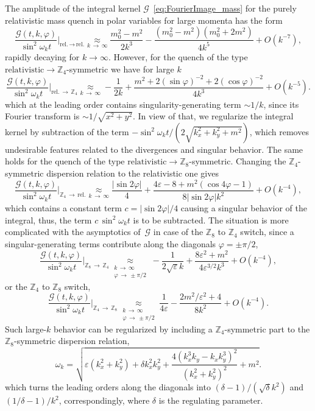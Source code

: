 \documentclass[a4paper,12pt]{article}
\newcommand{\be}{\begin{equation}}
\newcommand{\ee}{\end{equation}}
\newcommand{\eps}{\varepsilon}
\newcommand{\om}{\omega}
\newcommand{\largemom}{\underset{k\,\to\,\infty}{\approx}}
\newcommand{\Z}[1]{\mathbb{Z}_{#1}}
\begin{document}
The amplitude of the integral kernel $\mathcal{G}$~\eqref{eq:FourierImage_mass} for the purely relativistic mass quench in polar variables for large momenta has the form
\be
    \frac{\mathcal{G}(t, k, \varphi)}{\sin^2\om_k t}\Big|_{\text{rel.}\,\to\,\text{rel.}} \largemom \frac{m_0^2 - m^2}{2k^3} - \frac{(m_0^2 - m^2)(m_0^2 + 2m^2)}{4 k^5} + O\left(k^{-7}\right),
\ee
rapidly decaying for $k \to \infty$. However, for the quench of the type $\text{relativistic} \to \Z4$-symmetric we have for large $k$
\be
    \frac{\mathcal{G}(t, k, \varphi)}{\sin^2\om_k t}\Big|_{\text{rel.}\,\to\,\Z4} \largemom -\frac{1}{2k} + \frac{m^2 + 2(\sin\varphi)^{-2} + 2(\cos\varphi)^{-2}}{4 k^3} + O\left(k^{-5}\right).
\ee
which at the leading order contains singularity-generating term $\sim 1/k$, since its Fourier transform is $\sim 1/\sqrt{x^2 + y^2}$. In view of that, we regularize the integral kernel by subtraction of the term $-\sin^2\omega_k t/(2\sqrt{k_x^2 + k_y^2 + m^2})$, which removes undesirable features related to the divergences and singular behavior. The same holds for the quench of the type $\text{relativistic} \to \Z8$-symmetric. Changing the $\Z4$-symmetric dispersion relation to the relativistic one gives
\be
    \frac{\mathcal{G}(t, k, \varphi)}{\sin^2\om_k t}\Big|_{\Z4\,\to\,\text{rel.}} \largemom \frac{|\sin 2\varphi|}{4} + \frac{4\eps - 8 + m^2(\cos 4\varphi - 1)}{8|\sin 2\varphi|k^2} + O\left(k^{-4}\right),
\ee
which contains a constant term $c = |\sin 2\varphi|/4$ causing a singular behavior of the integral, thus, the term $c\,\sin^2\omega_k t$ is to be subtracted. The situation is more complicated with the asymptotics of~$\mathcal{G}$ in case of the $\Z8$ to $\Z4$ switch, since a singular-generating terms contribute along the diagonals $\varphi = \pm\pi/2$,
\be
    \frac{\mathcal{G}(t, k, \varphi)}{\sin^2\om_k t}\Big|_{\Z8\,\to\,\Z4} \underset{\substack{k\,\to\,\infty \\ \varphi\,\to\,\pm\pi/2}}{\approx} -\frac{1}{2\sqrt{\eps}k} + \frac{8\eps^2 + m^2}{4 \eps^{3/2}k^3} + O\left(k^{-4}\right),
\ee
or the $\Z4$ to $\Z8$ switch,
\be
    \frac{\mathcal{G}(t, k, \varphi)}{\sin^2\om_k t}\Big|_{\Z4\,\to\,\Z8} \underset{\substack{k\,\to\,\infty \\ \varphi\,\to\,\pm\pi/2}}{\approx} \frac{1}{4\eps} - \frac{2m^2/\eps^2 + 4}{8k^2} + O\left(k^{-4}\right).
\ee
Such large-$k$ behavior can be regularized by including a $\Z4$-symmetric part to the $\Z8$-symmetric dispersion relation,
\be
    \omega_k = \sqrt{\eps(k_x^2 + k_y^2) + \delta k_x^2 k_y^2 + \frac{4(k_x^3 k_y - k_x k_y^3)^2}{(k_x^2 + k_y^2)^2} + m^2}.
\ee
which turns the leading orders along the diagonals into $(\delta - 1)/(\sqrt{\delta}k^2)$ and $(1/\delta - 1)/k^2$, correspondingly, where $\delta$ is the regulating parameter.
\end{document}
